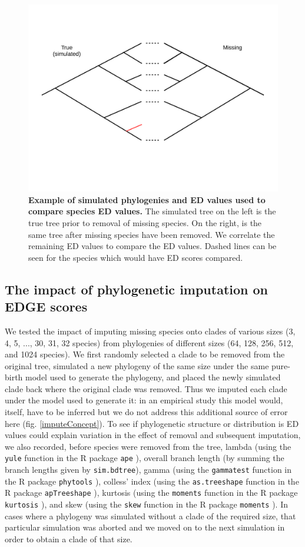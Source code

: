 \documentclass[12pt,english]{article}
\begin{document}
\begin{figure}[!ht]
  \center
  \includegraphics[width=.75\textwidth]{missingSpecies.png}
  \caption{\textbf{Example of simulated phylogenies and ED values used to
  compare species ED values.} The simulated tree on the left is the true tree
  prior to removal of missing species. On the right, is the same tree after
  missing species have been removed. We correlate the remaining ED values to
  compare the ED values. Dashed lines can be seen for the species which would
  have ED scores compared.}
  \label{missingSpecies}
\end{figure}

\subsection*{The impact of phylogenetic imputation on EDGE scores}
We tested the impact of imputing missing species onto clades of various sizes
(3, 4, 5, ..., 30, 31, 32 species) from phylogenies of different sizes (64, 128,
256, 512, and 1024 species). We first randomly selected a clade to be removed
from the original tree, simulated a new phylogeny of the same size under the
same pure-birth model used to generate the phylogeny, and placed the newly
simulated clade back where the original clade was removed. Thus we imputed each
clade under the model used to generate it: in an empirical study this model
would, itself, have to be inferred but we do not address this additional source
of error here (fig. \ref{imputeConcept}). To see if phylogenetic structure or distribution is ED values
could explain variation in the effect of removal and subsequent imputation, we
also recorded, before species were removed from the tree, lambda (using the
\texttt{yule} function in the R package \texttt{ape} \autocite{Paradis2017}),
overall branch length (by summing the branch lengths given by
\texttt{sim.bdtree}), gamma (using the \texttt{gammatest} function in the R
package \texttt{phytools} \autocite{Revell2017}), colless' index (using the
\texttt{as.treeshape} function in the R package \texttt{apTreeshape}
\autocite{Bortolussi2009}), kurtosis (using the \texttt{moments} function in the
R package \texttt{kurtosis} \autocite{Komsta2015}), and skew (using the
\texttt{skew} function in the R package \texttt{moments} \autocite{Komsta2015}).
In cases where a phylogeny was simulated without a clade of the required size,
that particular simulation was aborted and we moved on to the next simulation in
order to obtain a clade of that size.
\end{document}
